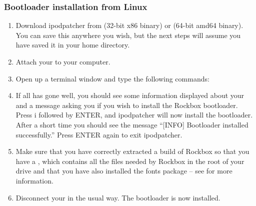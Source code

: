 \subsubsection{Bootloader installation from Linux}

\begin{enumerate}

\item Download ipodpatcher from
 (32-bit x86 
binary) or  
(64-bit amd64 binary). You can save this anywhere you wish, but the next 
steps will assume you have saved it in your home directory.

\item Attach your \dap{} to your computer.

\item Open up a terminal window and type the following commands:



\item If all has gone well, you should see some information displayed about
your \dap{} and a message asking you if you wish to install the Rockbox
bootloader. Press i followed by ENTER, and ipodpatcher will now install the
bootloader. After a short time you should see the message ``[INFO] Bootloader
installed successfully.'' Press ENTER again to exit ipodpatcher.

\item Make sure that you have correctly extracted a build of Rockbox so that
you have a , which contains all the files needed by Rockbox
in the root of your \daps{} drive and that you have also installed the fonts
package -- see  for more information.

\item Disconnect your \dap{} in the usual way. The bootloader is now installed.

\end{enumerate}
